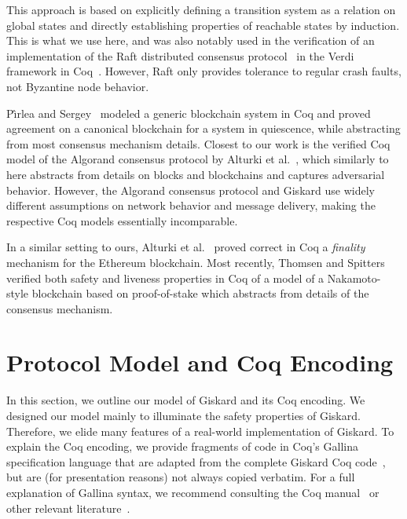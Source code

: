 \documentclass{easychair}
\begin{document}
 This approach is based on explicitly defining a transition system as a relation on global states and directly establishing properties of reachable states by induction. This is what we use here, and was also notably used in the verification of an implementation of the Raft distributed consensus protocol~\cite{Woos2016} in the Verdi framework in Coq~\cite{Wilcox2015}. However, Raft only provides tolerance to regular crash faults, not Byzantine node behavior. 

P{\^{\i}}rlea and Sergey~\cite{Pirlea2018} modeled a generic blockchain system in Coq and proved agreement on a canonical blockchain for a system in quiescence, while abstracting from most consensus mechanism details. Closest to our work is the verified Coq model of the Algorand consensus protocol by Alturki et al.~\cite{Alturki2020}, which similarly to here abstracts from details on blocks and blockchains and captures adversarial behavior. However, the Algorand consensus protocol and Giskard use widely different assumptions on network behavior and message delivery, making the respective Coq models essentially incomparable.

In a similar setting to ours, Alturki et al.~\cite{Gasper} proved correct in Coq a \emph{finality} mechanism for the Ethereum blockchain. Most recently, Thomsen and Spitters~\cite{Thomsen2020} verified both safety and liveness properties in Coq of a model of a Nakamoto-style blockchain based on proof-of-stake which abstracts from details of the consensus mechanism.

\section{Protocol Model and Coq Encoding}
\label{sec:encoding}
In this section, we outline our model of Giskard and its Coq encoding. We designed our model mainly to illuminate the safety properties of Giskard. Therefore, we elide many features of a real-world implementation of Giskard. To explain the Coq encoding, we provide fragments of code in Coq's Gallina specification language that are adapted from the complete Giskard Coq code~\cite{CoqGiskard}, but are (for presentation reasons) not always copied verbatim. For a full explanation of Gallina syntax, we recommend consulting the Coq manual~\cite{Gallina812} or other relevant literature~\cite{CoqArt}.
\end{document}
